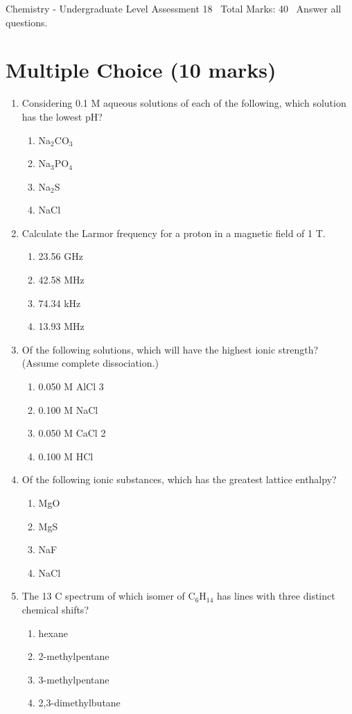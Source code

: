 \documentclass[12pt]{article}
\begin{document}
\begin{center}
Chemistry - Undergraduate Level Assessment 18 \
Total Marks: 40 \
Answer all questions.
\end{center}

\section*{Multiple Choice (10 marks)}
\begin{enumerate}[label=\arabic*.]
\item Considering 0.1 M aqueous solutions of each of the following, which solution has the lowest pH?
\begin{enumerate}[label=(\alph*)]
    \item Na$_{2}$CO$_{3}$
    \item Na$_{3}$PO$_{4}$
    \item Na$_{2}$S
    \item NaCl
\end{enumerate}
\item Calculate the Larmor frequency for a proton in a magnetic field of 1 T.
\begin{enumerate}[label=(\alph*)]
    \item 23.56 GHz
    \item 42.58 MHz
    \item 74.34 kHz
    \item 13.93 MHz
\end{enumerate}
\item Of the following solutions, which will have the highest ionic strength? (Assume complete dissociation.)
\begin{enumerate}[label=(\alph*)]
    \item 0.050 M AlCl 3
    \item 0.100 M NaCl
    \item 0.050 M CaCl 2
    \item 0.100 M HCl
\end{enumerate}
\item Of the following ionic substances, which has the greatest lattice enthalpy?
\begin{enumerate}[label=(\alph*)]
    \item MgO
    \item MgS
    \item NaF
    \item NaCl
\end{enumerate}
\item The 13 C spectrum of which isomer of C$_{6}$H$_{14}$ has lines with three distinct chemical shifts?
\begin{enumerate}[label=(\alph*)]
    \item hexane
    \item 2-methylpentane
    \item 3-methylpentane
    \item 2,3-dimethylbutane
\end{enumerate}
\end{enumerate}
\end{document}
